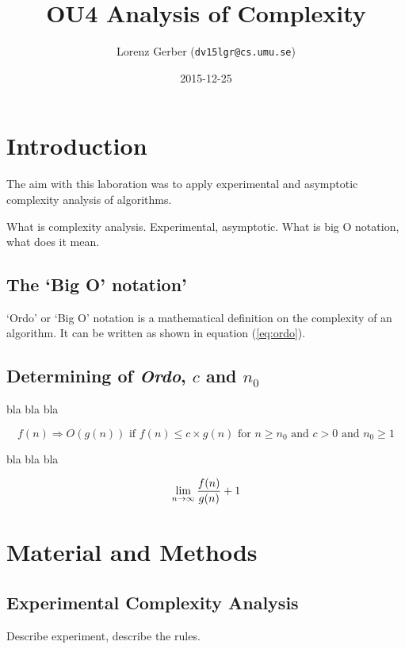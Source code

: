 \documentclass[a4paper,11pt,twoside]{article}
\title{OU4 Analysis of Complexity}
\author{Lorenz Gerber  ({\tt{dv15lgr@cs.umu.se}})}
\date{2015-12-25}
\begin{document}
\lstset{language=C}
\maketitle

\tableofcontents
\newpage

\section{Introduction} 
The aim with this laboration was to apply experimental and asymptotic
complexity analysis of algorithms. 

What is complexity analysis. Experimental, asymptotic. What is big O
notation, what does it mean.
\subsection{The `Big O' notation'}
`Ordo' or `Big O' notation is a mathematical definition on the
complexity of an algorithm. It can be written as shown in 
equation (\ref{eq:ordo})\cite[pp. 245]{janlert2000}.

\subsection{Determining of \textit{Ordo}, $c$ and $n_{0}$}
bla bla bla

\begin{equation} \label{eq:ordo}
f(n) \Rightarrow O(g(n)) \textrm{ if } f(n) \leq c \times g(n)
\textrm{ for } n \geq n_{0} \textrm{ and }
c > 0 \textrm{ and } n_{0} \geq 1
\end{equation}

bla bla bla

\begin{equation} \label{eq:limes}
\lim_{n \to \infty} {f(n) \over g(n)} + 1
\end{equation}



\section{Material and Methods}

\subsection{Experimental Complexity Analysis}
Describe experiment, describe the rules.
\end{document}
